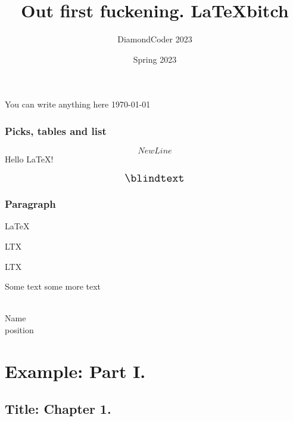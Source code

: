 \documentclass{book}
\title{Out first fuckening. \LaTeX bitch}
\author{DiamondCoder 2023}
\date{Spring 2023}
\begin{document}
\begin{titlepage}
    \centering
    You can write anything here
    \the\year \today
\end{titlepage}



    \section{Picks, tables and list}
    $$New Line$$
    Hello \LaTeX!

    $$
    \fontsize{14pt}{30pt}\selectfont
    \blindtext
    $$

    \section{Paragraph}
    {\raggedright
    \blindtext}

    {\raggedleft
    \blindtext}

    {\centering
    \blindtext}


    \mbox{\blindtext}

    \LaTeX

    L\hspace{-1mm}\raisebox{0.5mm}{\scalebox{0.8}{A}}\hspace{-0.5mm}T\hspace{-0.5mm}\raisebox{-1mm}{\scalebox{1.1}{E}}\hspace{-0.5mm}X

    L\hspace{-4pt}\raisebox{2pt}{\scalebox{0.65}{A}}\hspace{-2pt}T\hspace{-2pt}\raisebox{-2.7pt}{E}\hspace{-2pt}X

    Some text\hspace{-2mm} \raisebox{2mm}{\scalebox{0.5}{raised text}} some more text

    \newpage
    \blindtext

    \begin{flushright}
        \parbox{5cm}{\centering\dotfill\\
        Name\\
        position}\hspace*{1cm}
    \end{flushright}

    \begin{window}
        \blindtext
    \end{window}

    \diamondpar{\blindtext}

    \part{Example: Part I.}
    \chapter{Title: Chapter 1.}
\end{document}
